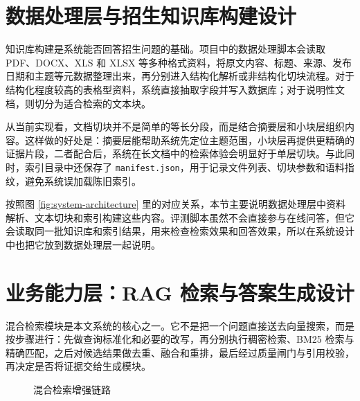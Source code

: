\documentclass[UTF8,zihao=-4,oneside]{ctexbook}
\numberwithin{equation}{chapter}
\begin{document}
\section{数据处理层与招生知识库构建设计}
知识库构建是系统能否回答招生问题的基础。项目中的数据处理脚本会读取 PDF、DOCX、XLS 和 XLSX 等多种格式资料，将原文内容、标题、来源、发布日期和主题等元数据整理出来，再分别进入结构化解析或非结构化切块流程\cite{projectanalysis,projectreadme}。对于结构化程度较高的表格型资料，系统直接抽取字段并写入数据库；对于说明性文档，则切分为适合检索的文本块。

从当前实现看，文档切块并不是简单的等长分段，而是结合摘要层和小块层组织内容。这样做的好处是：摘要层能帮助系统先定位主题范围，小块层再提供更精确的证据片段，二者配合后，系统在长文档中的检索体验会明显好于单层切块。与此同时，索引目录中还保存了 \texttt{manifest.json}，用于记录文件列表、切块参数和语料指纹，避免系统误加载陈旧索引。

按照图 \ref{fig:system-architecture} 里的对应关系，本节主要说明数据处理层中资料解析、文本切块和索引构建这些内容。评测脚本虽然不会直接参与在线问答，但它会读取同一批知识库和索引结果，用来检查检索效果和回答效果，所以在系统设计中也把它放到数据处理层一起说明。

\section{业务能力层：RAG 检索与答案生成设计}
混合检索模块是本文系统的核心之一。它不是把一个问题直接送去向量搜索，而是按步骤进行：先做查询标准化和必要的改写，再分别执行稠密检索、BM25 检索与精确匹配，之后对候选结果做去重、融合和重排，最后经过质量闸门与引用校验，再决定是否将证据交给生成模块。

\begin{figure}[H]
  \centering
  \caption{混合检索增强链路}
\end{figure}
\end{document}
